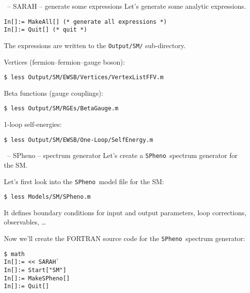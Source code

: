 \documentclass[11pt]{beamer}
\newcommand{\SPheno}{\texttt{SPheno}}
\begin{document}
\begin{frame}[fragile]{\insertsection\ -- SARAH -- generate some expressions}
  Let's  generate some analytic expressions.
  \begin{lstlisting}
In[]:= MakeAll[] (* generate all expressions *)
In[]:= Quit[] (* quit *)\end{lstlisting}
  The expressions are written to the \texttt{Output/SM/} sub-directory.

  \medskip

  Vertices (fermion--fermion--gauge boson):
  \begin{lstlisting}
$ less Output/SM/EWSB/Vertices/VertexListFFV.m\end{lstlisting}%
  Beta functions (gauge couplings):
  \begin{lstlisting}
$ less Output/SM/RGEs/BetaGauge.m\end{lstlisting}%
  1-loop self-energies:
  \begin{lstlisting}
$ less Output/SM/EWSB/One-Loop/SelfEnergy.m\end{lstlisting}%
\end{frame}


\begin{frame}[fragile]{\insertsection\ -- SPheno -- spectrum generator}
  Let's create a \SPheno\ spectrum generator for the SM.

  \bigskip

  Let's first look into the \SPheno\ model file for the SM:
  \begin{lstlisting}
$ less Models/SM/SPheno.m\end{lstlisting}%
  It defines boundary conditions for input and output parameters, loop
  corrections, observables, \ldots

  \bigskip

  Now we'll create the FORTRAN source code for the \SPheno\ spectrum
  generator:
  \begin{lstlisting}
$ math
In[]:= << SARAH`
In[]:= Start["SM"]
In[]:= MakeSPheno[]
In[]:= Quit[]\end{lstlisting}%

\end{frame}

\end{document}
